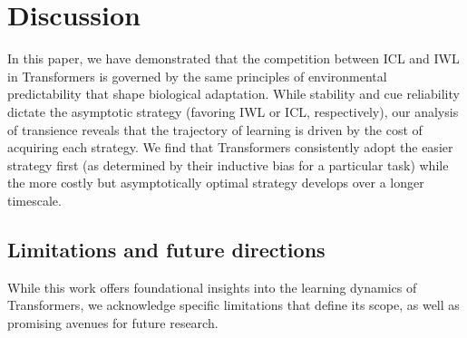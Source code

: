 \section{Discussion}

In this paper, we have demonstrated that the competition between ICL and IWL in Transformers is governed by the same principles of environmental predictability that shape biological adaptation. While stability and cue reliability dictate the asymptotic strategy (favoring IWL or ICL, respectively), our analysis of transience reveals that the trajectory of learning is driven by the cost of acquiring each strategy. We find that Transformers consistently adopt the easier strategy first (as determined by their inductive bias for a particular task) while the more costly but asymptotically optimal strategy develops over a longer timescale.


\subsection{Limitations and future directions}
\label{sec:limitations}

While this work offers foundational insights into the learning dynamics of Transformers, we acknowledge specific limitations that define its scope, as well as promising avenues for future research.

